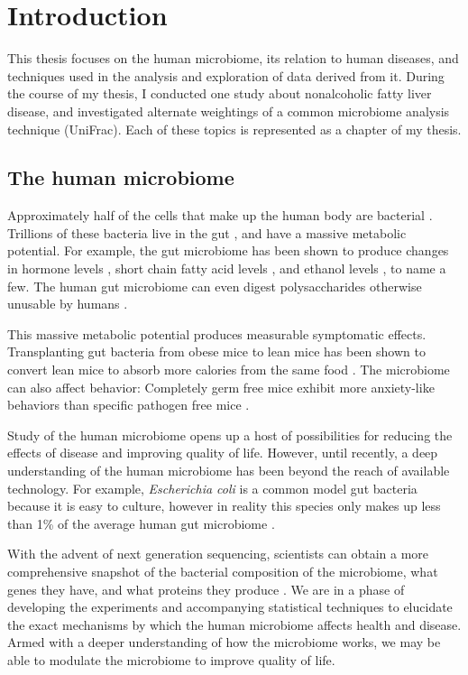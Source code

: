 \chapter{Introduction}
This thesis focuses on the human microbiome, its relation to human diseases, and techniques used in the analysis and exploration of data derived from it. During the course of my thesis, I conducted one study about nonalcoholic fatty liver disease, and investigated alternate weightings of a common microbiome analysis technique (UniFrac). Each of these topics is represented as a chapter of my thesis.

\section{The human microbiome}
Approximately half of the cells that make up the human body are bacterial \cite{sender2016revised}. Trillions of these bacteria live in the gut \cite{guarner2003gut}, and have a massive metabolic potential. For example, the gut microbiome has been shown to produce changes in hormone levels \cite{markle2013sex}, short chain fatty acid levels \cite{turnbaugh2008diet}, and ethanol levels \cite{krebs1970physiological}, to name a few. The human gut microbiome can even digest polysaccharides otherwise unusable by humans \cite{flint2008polysaccharide}.

This massive metabolic potential produces measurable symptomatic effects. Transplanting gut bacteria from obese mice to lean mice has been shown to convert lean mice to absorb more calories from the same food \cite{turnbaugh2006obesity}. The microbiome can also affect behavior: Completely germ free mice exhibit more anxiety-like behaviors than specific pathogen free mice \cite{neufeld2011reduced}.

Study of the human microbiome opens up a host of possibilities for reducing the effects of disease and improving quality of life. However, until recently, a deep understanding of the human microbiome has been beyond the reach of available technology. For example, \textit{Escherichia coli} is a common model gut bacteria because it is easy to culture, however in reality this species only makes up less than 1\% of the average human gut microbiome \cite{arumugam2011enterotypes}.

With the advent of next generation sequencing, scientists can obtain a more comprehensive snapshot of the bacterial composition of the microbiome, what genes they have, and what proteins they produce \cite{di2013high}. We are in a phase of developing the experiments and accompanying statistical techniques to elucidate the exact mechanisms by which the human microbiome affects health and disease. Armed with a deeper understanding of how the microbiome works, we may be able to modulate the microbiome to improve quality of life.

